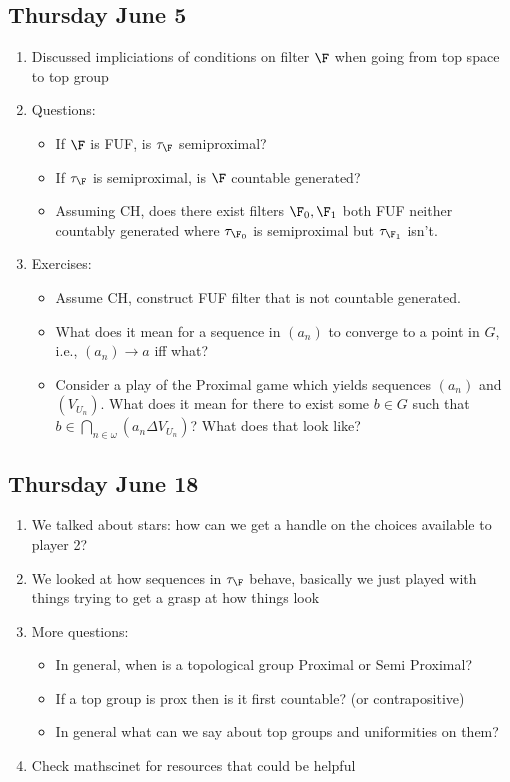 \documentclass{article}
\begin{document}
\subsection*{Thursday June 5}
\begin{enumerate}
    \item Discussed impliciations of conditions on filter \(\F\) when going from top space to top group 
    \item Questions:
    \begin{itemize}
        \item If \(\F\) is FUF, is \(\tau_{\F}\) semiproximal?
        \item If \(\tau_{\F}\) is semiproximal, is \(\F\) countable generated?
        \item Assuming CH, does there exist filters \(\F_0, \F_1\) both FUF neither countably generated where \(\tau_{\F_0}\) is semiproximal but \(\tau_{\F_1}\) isn't.
    \end{itemize}    
    \item Exercises: 
    \begin{itemize}
        \item Assume CH, construct FUF filter that is not countable generated. \checkmark
        \item What does it mean for a sequence in \((a_n)\) to converge to a point in \(G\), i.e., \((a_n)\to a\) iff what? 
        \item Consider a play of the Proximal game which yields sequences \((a_n)\) and \((V_{U_n})\). What does it mean for there to exist some \(b \in G\) such that \(b \in \bigcap_{n \in \omega}(a_n \Delta V_{U_n})\)? What does that look like?
    \end{itemize}
    \end{enumerate}

\subsection*{Thursday June 18}
\begin{enumerate}
    \item We talked about stars: how can we get a handle on the choices available to player 2?
    \item We looked at how sequences in \(\tau_{\F}\) behave, basically we just played with things trying to get a grasp at how things look
    \item More questions:
    \begin{itemize}
        \item In general, when is a topological group Proximal or Semi Proximal?
        \item If a top group is prox then is it first countable? (or contrapositive)
        \item In general what can we say about top groups and uniformities on them?
    \end{itemize}
    \item Check mathscinet for resources that could be helpful
\end{enumerate}
\end{document}
